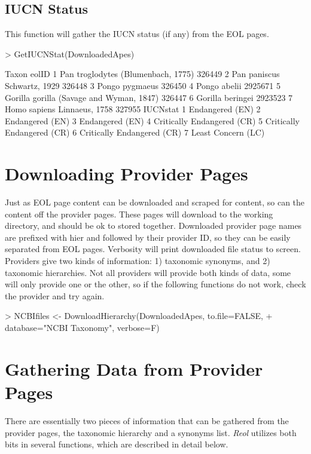 \documentclass[12pt]{article}
\begin{document}
\subsection{IUCN Status}
This function will gather the IUCN status (if any) from the EOL pages.

\begin{Schunk}
\begin{Sinput}
> GetIUCNStat(DownloadedApes)
\end{Sinput}
\begin{Soutput}
                                     Taxon   eolID
1       Pan troglodytes (Blumenbach, 1775)  326449
2              Pan paniscus Schwartz, 1929  326448
3                           Pongo pygmaeus  326450
4                             Pongo abelii 2925671
5 Gorilla gorilla (Savage and Wyman, 1847)  326447
6                         Gorilla beringei 2923523
7              Homo sapiens Linnaeus, 1758  327955
                    IUCNstat
1            Endangered (EN)
2            Endangered (EN)
3            Endangered (EN)
4 Critically Endangered (CR)
5 Critically Endangered (CR)
6 Critically Endangered (CR)
7         Least Concern (LC)
\end{Soutput}
\end{Schunk}

\section{Downloading Provider Pages}
Just as EOL page content can be downloaded and scraped for content, so can the content off the provider pages. These pages will download to the working directory, and should be ok to stored together. Downloaded provider page names are prefixed with hier and followed by their provider ID, so they can be easily separated from EOL pages. Verbosity will print downloaded file status to screen. Providers give two kinds of information: 1) taxonomic synonyms, and 2) taxonomic hierarchies. Not all providers will provide both kinds of data, some will only provide one or the other, so if the following functions do not work, check the provider and try again. 

\begin{Schunk}
\begin{Sinput}
> NCBIfiles <- DownloadHierarchy(DownloadedApes, to.file=FALSE, 
+ 	database="NCBI Taxonomy", verbose=F)
\end{Sinput}
\end{Schunk}

\section{Gathering Data from Provider Pages}
There are essentially two pieces of information that can be gathered from the provider pages, the taxonomic hierarchy and a synonyms list. \textit{Reol} utilizes both bits in several functions, which are described in detail below. 
\end{document}
